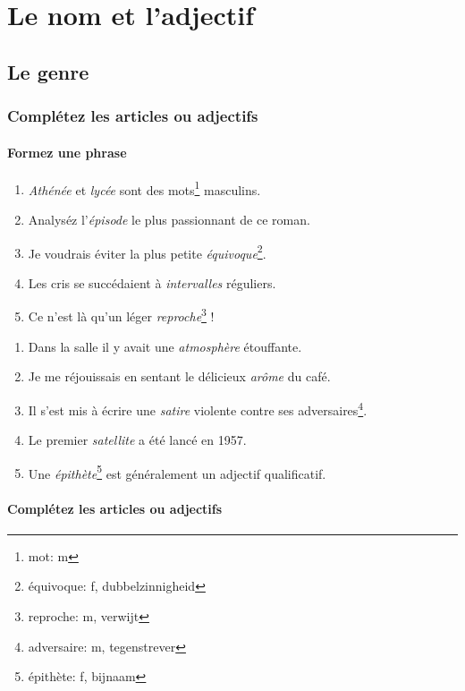 \documentclass[11pt, french]{report}
\begin{document}
\part{Le nom et l'adjectif}

\chapter{Le genre}

\section{Complétez les articles ou adjectifs}

\vfill

\subsection{Formez une phrase}

\begin{enumerate}
\item \textit{Athénée} et \textit{lycée} sont des mots\footnote{mot: m} masculins.
\item Analyséz l'\textit{épisode} le plus passionnant de ce roman.
\item Je voudrais éviter la plus petite \textit{équivoque}\footnote{équivoque: f, dubbelzinnigheid}.
\item Les cris se succédaient à \textit{intervalles} réguliers.
\item Ce n'est là qu'un léger \textit{reproche}\footnote{reproche: m, verwijt} !
\end{enumerate}

\vfill

\begin{enumerate}
\item Dans la salle il y avait une \textit{atmosphère} étouffante.
\item Je me réjouissais en sentant le délicieux \textit{arôme} du café.
\item Il s'est mis à écrire une \textit{satire} violente contre ses adversaires\footnote{adversaire: m, tegenstrever}.
\item Le premier \textit{satellite} a été lancé en 1957.
\item Une \textit{épithète}\footnote{épithète: f, bijnaam} est généralement un adjectif qualificatif.
\end{enumerate}

\vfill

\subsection{Complétez les articles ou adjectifs}
\end{document}
